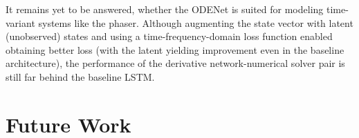 It remains yet to be answered, whether the ODENet is suited for modeling time-variant systems like the phaser. Although augmenting the state vector with latent (unobserved) states and using a time-frequency-domain loss function enabled obtaining better loss (with the latent yielding improvement even in the baseline architecture), the performance of the derivative network-numerical solver pair is still far behind the baseline \ac{LSTM}.

\section{Future Work}


